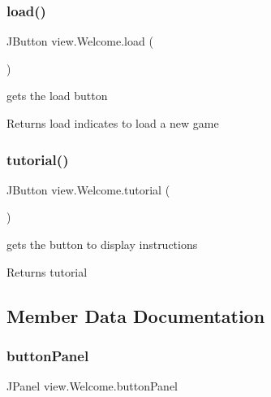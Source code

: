 \subsubsection{\texorpdfstring{load()}{load()}}
{\footnotesize\ttfamily J\+Button view.\+Welcome.\+load (\begin{DoxyParamCaption}{ }\end{DoxyParamCaption})}



gets the load button 

\begin{DoxyReturn}{Returns}
load indicates to load a new game 
\end{DoxyReturn}
\hypertarget{classview_1_1_welcome_aaf45e35ac75c1b6f8badd358dd2c2a08}{}\label{classview_1_1_welcome_aaf45e35ac75c1b6f8badd358dd2c2a08} 
\subsubsection{\texorpdfstring{tutorial()}{tutorial()}}
{\footnotesize\ttfamily J\+Button view.\+Welcome.\+tutorial (\begin{DoxyParamCaption}{ }\end{DoxyParamCaption})}



gets the button to display instructions 

\begin{DoxyReturn}{Returns}
tutorial 
\end{DoxyReturn}


\subsection{Member Data Documentation}
\hypertarget{classview_1_1_welcome_a846eb5f76566811de2fb852412fb56dc}{}\label{classview_1_1_welcome_a846eb5f76566811de2fb852412fb56dc} 
\subsubsection{\texorpdfstring{button\+Panel}{buttonPanel}}
{\footnotesize\ttfamily J\+Panel view.\+Welcome.\+button\+Panel\hspace{0.3cm}{\ttfamily [private]}}


